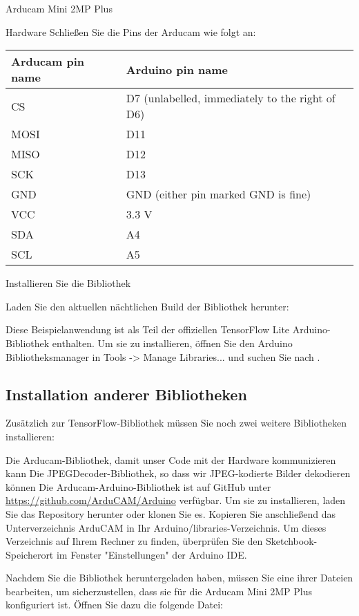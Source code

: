 Arducam Mini 2MP Plus

Hardware
Schließen Sie die Pins der Arducam wie folgt an:

\begin{tabular}{ll}
  Arducam pin name & Arduino pin name \\ \hline
  CS               & D7 (unlabelled, immediately to the right of D6) \\
  MOSI             & D11 \\
  MISO             & D12 \\
  SCK              & D13 \\
  GND              & GND (either pin marked GND is fine) \\
  VCC              & 3.3 V \\
  SDA              & A4 \\
  SCL              & A5 \\
\end{tabular}

Installieren Sie die Bibliothek 

Laden Sie den aktuellen nächtlichen Build der Bibliothek herunter: 

Diese Beispielanwendung ist als Teil der offiziellen TensorFlow Lite Arduino-Bibliothek enthalten. Um sie zu installieren, öffnen Sie den Arduino Bibliotheksmanager in Tools -> Manage Libraries... und suchen Sie nach .

\subsection{Installation anderer Bibliotheken}

Zusätzlich zur TensorFlow-Bibliothek müssen Sie noch zwei weitere Bibliotheken installieren:

Die Arducam-Bibliothek, damit unser Code mit der Hardware kommunizieren kann
Die JPEGDecoder-Bibliothek, so dass wir JPEG-kodierte Bilder dekodieren können
Die Arducam-Arduino-Bibliothek ist auf GitHub unter \url{https://github.com/ArduCAM/Arduino} verfügbar. Um sie zu installieren, laden Sie das Repository herunter oder klonen Sie es. Kopieren Sie anschließend das Unterverzeichnis ArduCAM in Ihr Arduino/libraries-Verzeichnis. Um dieses Verzeichnis auf Ihrem Rechner zu finden, überprüfen Sie den Sketchbook-Speicherort im Fenster "Einstellungen" der Arduino IDE.

Nachdem Sie die Bibliothek heruntergeladen haben, müssen Sie eine ihrer Dateien bearbeiten, um sicherzustellen, dass sie für die Arducam Mini 2MP Plus konfiguriert ist. Öffnen Sie dazu die folgende Datei:

